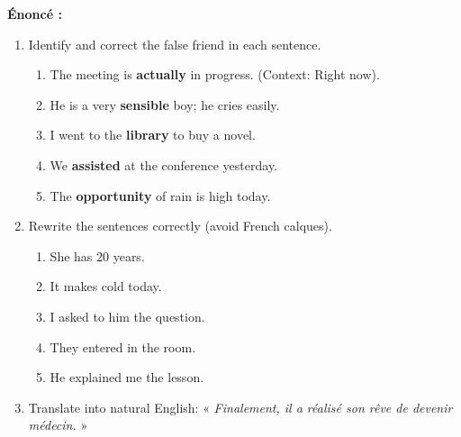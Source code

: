 \documentclass[11pt]{article}
\begin{document}
\begin{exoresolu}
\textbf{Énoncé :}
\begin{enumerate}
    \item Identify and correct the false friend in each sentence.
    \begin{enumerate}
        \item The meeting is \textbf{actually} in progress. (Context: Right now).
        \item He is a very \textbf{sensible} boy; he cries easily.
        \item I went to the \textbf{library} to buy a novel.
        \item We \textbf{assisted} at the conference yesterday.
        \item The \textbf{opportunity} of rain is high today.
    \end{enumerate}
    \item Rewrite the sentences correctly (avoid French calques).
    \begin{enumerate}
        \item She has 20 years.
        \item It makes cold today.
        \item I asked to him the question.
        \item They entered in the room.
        \item He explained me the lesson.
    \end{enumerate}
    \item Translate into natural English: « \textit{Finalement, il a réalisé son rêve de devenir médecin.} »
\end{enumerate}


\end{exoresolu}
\end{document}
